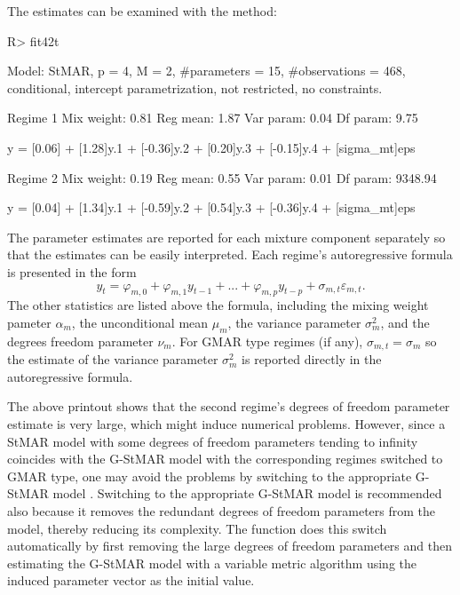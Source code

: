 \documentclass[nojss]{jss} %
\begin{document}
The estimates can be examined with the  method:
%
\begin{CodeChunk}
\begin{CodeInput}
R> fit42t
\end{CodeInput}
\begin{CodeOutput}
Model:
 StMAR, p = 4, M = 2, #parameters = 15, #observations = 468,
 conditional, intercept parametrization, not restricted, no constraints.

Regime 1
Mix weight: 0.81
Reg mean: 1.87
Var param: 0.04
Df param: 9.75

y = [0.06] + [1.28]y.1 + [-0.36]y.2 + [0.20]y.3 + [-0.15]y.4 + [sigma_mt]eps

Regime 2
Mix weight: 0.19
Reg mean: 0.55
Var param: 0.01
Df param: 9348.94

y = [0.04] + [1.34]y.1 + [-0.59]y.2 + [0.54]y.3 + [-0.36]y.4 + [sigma_mt]eps
\end{CodeOutput}
\end{CodeChunk}
%
The parameter estimates are reported for each mixture component separately so that the estimates can be easily interpreted. Each regime's autoregressive formula is presented in the form
\begin{equation}
y_t = \varphi_{m,0} + \varphi_{m,1}y_{t - 1} + ... + \varphi_{m,p}y_{t - p} + \sigma_{m,t}\varepsilon_{m,t}.
\end{equation}
The other statistics are listed above the formula, including the mixing weight pameter $\alpha_m$, the unconditional mean $\mu_m$, the variance parameter $\sigma_m^2$, and the degrees freedom parameter $\nu_m$. For GMAR type regimes (if any), $\sigma_{m,t}=\sigma_m$ so the estimate of the variance parameter $\sigma_m^2$ is reported directly in the autoregressive formula.

The above printout shows that the second regime's degrees of freedom parameter estimate is very large, which might induce numerical problems. However, since a StMAR model with some degrees of freedom parameters tending to infinity coincides with the G-StMAR model with the corresponding regimes switched to GMAR type, one may avoid the problems by switching to the appropriate G-StMAR model \citep[Section 4]{Virolainen:2020}. Switching to the appropriate G-StMAR model is recommended also because it removes the redundant degrees of freedom parameters from the model, thereby reducing its complexity. The function  does this switch automatically by first removing the large degrees of freedom parameters and then estimating the G-StMAR model with a variable metric algorithm \citep[algorithm 21]{Nash:1990} using the induced parameter vector as the initial value.
\end{document}
